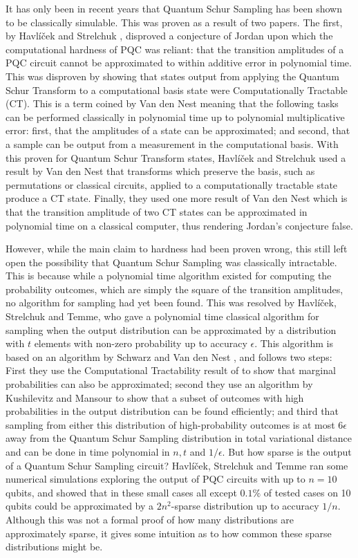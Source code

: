 It has only been in recent years that Quantum Schur Sampling has been shown to be classically simulable. This was proven as a result of two papers. The first, by Havl\'{i}\v{c}ek and Strelchuk \cite{havlicek2018}, disproved a conjecture of Jordan upon which the computational hardness of PQC was reliant: that the transition amplitudes of a PQC circuit cannot be approximated to within additive error in polynomial time. This was disproven by showing that states output from applying the Quantum Schur Transform to a computational basis state were Computationally Tractable (CT). This is a term coined by Van den Nest \cite{vandennest2011} meaning that the following tasks can be performed classically in polynomial time up to polynomial multiplicative error: first, that the amplitudes of a state can be approximated; and second, that a sample can be output from a measurement in the computational basis. With this proven for Quantum Schur Transform states, Havl\'{i}\v{c}ek and Strelchuk used a result by Van den Nest that transforms which preserve the basis, such as permutations or classical circuits, applied to a computationally tractable state produce a CT state. Finally, they used one more result of Van den Nest which is that the transition amplitude of two CT states can be approximated in polynomial time on a classical computer, thus rendering Jordan's conjecture false.

However, while the main claim to hardness had been proven wrong, this still left open the possibility that Quantum Schur Sampling was classically intractable. This is because while a polynomial time algorithm existed for computing the probability outcomes, which are simply the square of the transition amplitudes, no algorithm for sampling had yet been found. This was resolved by Havl\'{i}\v{c}ek, Strelchuk and Temme, who gave a polynomial time classical algorithm for sampling when the output distribution can be approximated by a distribution with $t$ elements with non-zero probability up to accuracy $\epsilon$. This algorithm is based on an algorithm by Schwarz and Van den Nest \cite{schwarz2013}, and follows two steps: First they use the Computational Tractability result of \cite{havlicek2018} to show that marginal probabilities can also be approximated; second they use an algorithm by Kushilevitz and Mansour to show that a subset of outcomes with high probabilities in the output distribution can be found efficiently; and third that sampling from either this distribution of high-probability outcomes is at most $6\epsilon$ away from the Quantum Schur Sampling distribution in total variational distance and can be done in time polynomial in $n, t$ and $1/\epsilon$. But how sparse is the output of a Quantum Schur Sampling circuit? Havl\'{i}\v{c}ek, Strelchuk and Temme ran some numerical simulations exploring the output of PQC circuits with up to $n=10$ qubits, and showed that in these small cases all except $0.1\%$ of tested cases on 10 qubits could be approximated by a $2n^2$-sparse distribution up to accuracy $1/n$. Although this was not a formal proof of how many distributions are approximately sparse, it gives some intuition as to how common these sparse distributions might be.
